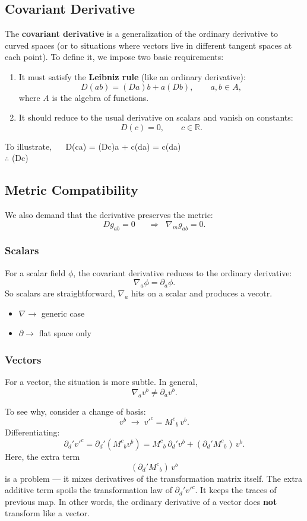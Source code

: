 \documentclass[14pt]{article} %
\begin{document}
\subsection{Covariant Derivative}
The \textbf{covariant derivative} is a generalization of the ordinary derivative to curved spaces (or to situations where vectors live in different tangent spaces at each point). To define it, we impose two basic requirements:

\begin{enumerate}
    \item It must satisfy the \textbf{Leibniz rule} (like an ordinary derivative):
    \[
    D(ab) = (Da)b + a(Db), \qquad a,b \in A ,
    \]
    where $A$ is the algebra of functions.  

    \item It should reduce to the usual derivative on scalars and vanish on constants:
    \[
    D(c) = 0, \qquad c \in \mathbb{R}.
    \]
    \end{enumerate}
To illustrate, $\quad$
    D(ca) = (Dc)a + c(da) = c(da) \\
    $\therefore$ (Dc) 
\subsection*{Metric Compatibility}
We also demand that the derivative preserves the metric:
\[
D g_{ab} = 0 \quad \;\;\Rightarrow\;\; \nabla_m g_{ab} = 0.
\]
\subsubsection*{Scalars}
For a scalar field $\phi$, the covariant derivative reduces to the ordinary derivative:
\[
\nabla_a \phi = \partial_a \phi.
\]
So scalars are straightforward, $\nabla_a$ hits on a scalar and produces a vecotr.
\begin{itemize}
    \item $\nabla \rightarrow$ generic case
    \item $\partial \rightarrow$ flat space only
\end{itemize}
\subsubsection*{Vectors}
For a vector, the situation is more subtle. In general,
\[
\nabla_a v^b \neq \partial_a v^b.
\]

To see why, consider a change of basis:
\[
v^b \;\to\; v'^c = M^c{}_b \, v^b.
\]
Differentiating:
\[
\partial_d' v'^c 
= \partial_d' (M^c{}_b v^b) 
= M^c{}_b \, \partial_d' v^b + (\partial_d' M^c{}_b)\, v^b.
\]
Here, the extra term 
\[
(\partial_d' M^c{}_b)\, v^b
\]
is a problem --- it mixes derivatives of the transformation matrix itself.
The extra additive term spoils the transformation law of $\partial_d' v'^c$. It keeps the traces of previous map.
In other words, the ordinary derivative of a vector does \textbf{not} transform like a vector. 
\end{document}
